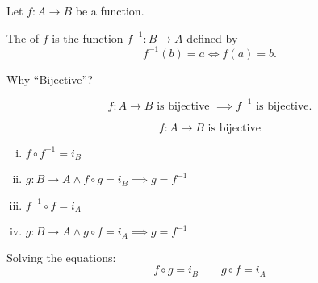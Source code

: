 \begin{frame}{}
  \begin{definition}[Inverse]
    Let $f: A \to B$ be a  function.

    The  of $f$ is the function $f^{-1}: B \to A$ defined by
    \[
      f^{-1}(b) = a \iff f(a) = b.
    \]
  \end{definition}

  \pause
  \vspace{0.80cm}
  \centerline{ Why ``Bijective''?}


\end{frame}

\begin{frame}{}
  \begin{theorem}[UD Theorem $15.4$ (ii)]
    \[
      f: A \to B \text{ is bijective } \implies f^{-1} \text{ is bijective}.
    \]
  \end{theorem}
\end{frame}

\begin{frame}{}
  \begin{theorem}
    \[
      f: A \to B \text{ is bijective}
    \]

    \begin{enumerate}[(i)]
      \item $f \circ f^{-1} = i_B$
      \item $g: B \to A \land f \circ g = i_B \implies g = f^{-1}$
      \vspace{0.30cm}
      \item $f^{-1} \circ f = i_A$
      \item $g: B \to A \land g \circ f = i_A \implies g = f^{-1}$
    \end{enumerate}
  \end{theorem}

  \pause
  \vspace{0.30cm}
  \begin{alertblock}{Solving the equations:}
    \[
      f \circ g = i_B \qquad g \circ f = i_A
    \]
  \end{alertblock}
\end{frame}

